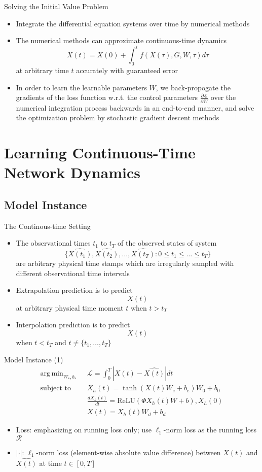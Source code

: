 \documentclass{beamer}
\DeclareMathOperator*{\argmin}{arg\,min}
\begin{document}
\begin{frame}{Solving the Initial Value Problem}
\begin{itemize}
\item Integrate the differential equation systems over time by numerical methods
\item The numerical methods can approximate continuous-time dynamics\[
X(t)=X(0)+\int_0^tf(X(\tau),G,W,\tau)d\tau
\]at arbitrary time $t$ accurately with guaranteed error
\item In order to learn the learnable parameters $W$, we back-propogate the gradients of the loss function w.r.t. the control parameters $\frac{\partial\mathcal{L}}{\partial W}$ over the numerical integration process backwards in an end-to-end manner, and solve the optimization problem by stochastic gradient descent methods
\end{itemize}
\end{frame}

\section{Learning Continuous-Time Network Dynamics}
\subsection{Model Instance}

\begin{frame}{The Continous-time Setting}
\begin{itemize}
\item The observational times $t_1$ to $t_T$ of the observed states of system\[
\{\hat{X(t_1)},\hat{X(t_2)},\dots,\hat{X(t_T)}:0\leqslant t_1\leqslant\dots\leqslant t_T\}
\]are arbitrary physical time stamps which are irregularly sampled with different observational time intervals
\item Extrapolation prediction is to predict\[
X(t)
\]at arbitrary physical time moment $t$ when $t>t_T$
\item Interpolation prediction is to predict\[
X(t)
\] when $t<t_T$ and $t\ne\{t_1,\dots,t_T\}$
\end{itemize}
\end{frame}

\begin{frame}{Model Instance (1)}\[
\begin{split}
\argmin_{W_*,b_*}\text{ }&\mathcal{L}=\int_0^T|X(t)-\hat{X(t)}|dt\\
\text{subject to }&X_h(t)=\tanh(X(t)W_e+b_e)W_0+b_0\\
&\frac{dX_h(t)}{dt}=\text{ReLU}(\Phi X_h(t)W+b),X_h(0)\\
&X(t)=X_h(t)W_d+b_d
\end{split}
\]
\begin{itemize}
\item Loss: emphasizing on running loss only; use $\ell_1$-norm loss as the running loss $\mathcal R$
\item $|\cdot|$: $\ell_1$-norm loss (element-wise absolute value difference) between $X(t)$ and $\hat{X(t)}$ at time $t\in[0,T]$
\end{itemize}
\end{frame}
\end{document}
